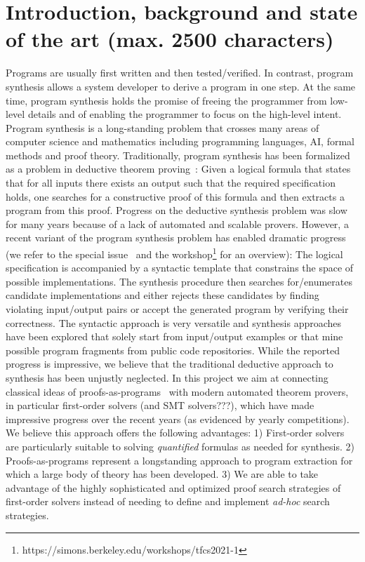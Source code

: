 \documentclass[a4paper,12pt]{article}
\begin{document}
\section{Introduction, background and state of the art (max. 2500 characters)}
Programs are usually first written and then tested/verified.
In contrast, program synthesis allows a system developer to derive a program in one step.
At the same time, program synthesis holds the promise of freeing the programmer from low-level details and of enabling the programmer to focus on the high-level intent.
Program synthesis is a long-standing problem that crosses many areas of computer science and mathematics including programming languages, AI, formal methods and proof theory.
Traditionally, program synthesis has been formalized as a problem in deductive theorem proving~\cite{conf/ijcai/MannaW79}:
Given a logical formula that states that for all inputs there exists an output such that the required specification holds, one searches for a constructive proof of this formula and then extracts a program from this proof.
Progress on the deductive synthesis problem was slow for many years because of a lack of automated and scalable provers.
However, a recent variant of the program synthesis problem has enabled dramatic progress (we refer to the special issue~\cite{fisman2022special} and the workshop\footnote{https://simons.berkeley.edu/workshops/tfcs2021-1} for an overview):
The logical specification is accompanied by a syntactic template that constrains the space of possible implementations.
The synthesis procedure then searches for/enumerates candidate implementations and either rejects these candidates by finding violating input/output pairs or accept the generated program by verifying their correctness.
The syntactic approach is very versatile and synthesis approaches have been explored that solely start from input/output examples or that mine possible program fragments from public code repositories.
While the reported progress is impressive, we believe that the traditional deductive approach to synthesis has been unjustly neglected.
In this project we aim at connecting classical ideas of proofs-as-programs~\cite{?} with modern automated theorem provers, in particular first-order solvers (and SMT solvers???), which have made impressive progress over the recent years (as evidenced by yearly competitions).
We believe this approach offers the following advantages:
1) First-order solvers are particularly suitable to solving \emph{quantified} formulas as needed for synthesis.
2) Proofs-as-programs represent a longstanding approach to program extraction for which a large body of theory has been developed.
3) We are able to take advantage of the highly sophisticated and optimized proof search strategies of first-order solvers instead of needing to define and implement \emph{ad-hoc} search strategies.
\end{document}
